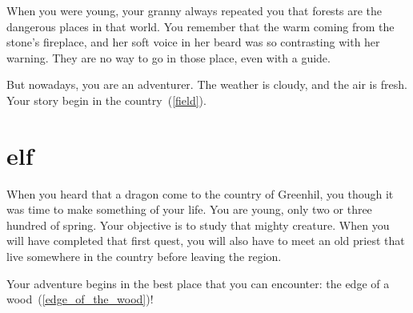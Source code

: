 When you were young, your granny always repeated you that forests are the
dangerous places in that world. You remember that the warm coming from the
stone's fireplace, and her soft voice in her beard was so contrasting with her
warning. They are no way to go in those place, even with a guide.

But nowadays, you are an adventurer. The weather is cloudy, and the air is
fresh. Your story begin in the country~(\ref{field}).

\section{elf}

When you heard that a dragon come to the country of Greenhil, you though it was
time to make something of your life. You are young, only two or three hundred
of spring. Your objective is to study that mighty creature. When you will have
completed that first quest, you will also have to meet an old priest that live
somewhere in the country before leaving the region.

Your adventure begins in the best place that you can encounter: the edge of a
wood~(\ref{edge_of_the_wood})!

